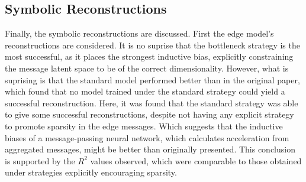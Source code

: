 \documentclass[11pt]{article}
\begin{document}
\subsection{Symbolic Reconstructions}
Finally, the symbolic reconstructions are discussed. First the edge model's reconstructions are considered. It is no suprise that the bottleneck strategy is the most successful, as it places the strongest inductive bias, explicitly constraining the message latent space to be of the correct dimensionality. However, what is suprising is that the standard model performed better than in the original paper, which found that no model trained under the standard strategy could yield a successful reconstruction. Here, it was found that the standard strategy was able to give some successful reconstructions, despite not having any explicit strategy to promote sparsity in the edge messages. Which suggests that the inductive biases of a message-passing neural network, which calculates acceleration from aggregated messages, might be better than originally presented. This conclusion is supported by the $R^2$ values observed, which were comparable to those obtained under strategies explicitly encouraging sparsity.
\end{document}

